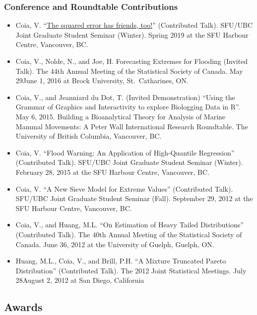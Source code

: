 \documentclass[]{article}
\begin{document}
\hypertarget{conference-and-roundtable-contributions}{%
\subsubsection{Conference and Roundtable Contributions}\label{conference-and-roundtable-contributions}}

\begin{itemize}
\item
  Coia, V. ``\href{https://vincenzocoia.com/post/20190316-ubc-sfu/}{The squared error has friends, too!}''
  (Contributed Talk). SFU/UBC Joint Graduate Student Seminar (Winter).
  Spring 2019 at the SFU Harbour Centre, Vancouver, BC.
\item
  Coia, V., Nolde, N., and Joe, H. Forecasting Extremes for Flooding
  (Invited Talk). The 44th Annual Meeting of the Statistical Society
  of Canada. May 29June 1, 2016 at Brock University, St.~Catharines,
  ON.
\item
  Coia, V., and Jeanniard du Dot, T. (Invited Demonstration) ``Using
  the Grammar of Graphics and Interactivity to explore Biologging Data
  in R''. May 6, 2015. Building a Bioanalytical Theory for Analysis of
  Marine Mammal Movements: A Peter Wall International Research
  Roundtable. The University of British Columbia, Vancouver, BC.
\item
  Coia, V. ``Flood Warning: An Application of High-Quantile Regression''
  (Contributed Talk). SFU/UBC Joint Graduate Student Seminar (Winter).
  February 28, 2015 at the SFU Harbour Centre, Vancouver, BC.
\item
  Coia, V. ``A New Sieve Model for Extreme Values'' (Contributed Talk).
  SFU/UBC Joint Graduate Student Seminar (Fall). September 29, 2012 at
  the SFU Harbour Centre, Vancouver, BC.
\item
  Coia, V., and Huang, M.L. ``On Estimation of Heavy Tailed
  Distributions'' (Contributed Talk). The 40th Annual Meeting of the
  Statistical Society of Canada. June 36, 2012 at the University of
  Guelph, Guelph, ON.
\item
  Huang, M.L., Coia, V., and Brill, P.H. ``A Mixture Truncated Pareto
  Distribution'' (Contributed Talk). The 2012 Joint Statistical
  Meetings. July 28August 2, 2012 at San Diego, California
\end{itemize}

\hypertarget{awards}{%
\subsection{Awards}\label{awards}}
\end{document}
